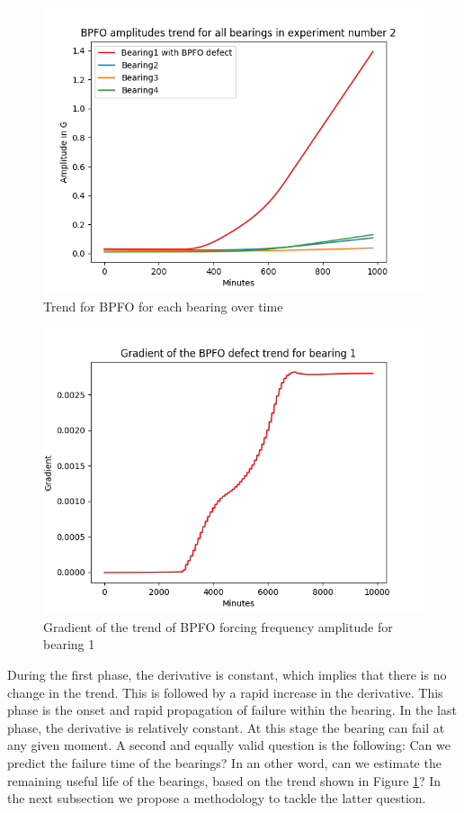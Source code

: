 \documentclass[../Main/thesis.tex]{subfiles}
\begin{document}
\begin{figure}[H] 
   \centering
   \includegraphics[width=4.9in]{../fig/experiment2_bearing_fft_trend.png} 
   \caption{Trend for BPFO for each bearing over time}
   \label{fig:experiment2_bearing_fft_trend}
\end{figure}
\begin{figure}[H] %
   \centering
   \includegraphics[width=4.9in]{../fig/bearing1_bpfo_trend_grad.png} 
   \caption{Gradient of the trend of BPFO forcing frequency amplitude for bearing 1}
   \label{fig:grad_trend}
\end{figure}
\clearpage
\justify
During the first phase, the derivative is constant, which implies that there is no change in the trend. This is followed by a rapid increase in the derivative. This phase is the onset and rapid propagation of failure within the bearing. In the last phase, the derivative is relatively constant. At this stage the bearing can fail at any given moment. A second and equally valid question is the following: Can we predict the failure time of the bearings? In an other word, can we estimate the remaining useful life of the bearings, based on the trend shown in Figure \ref{fig:experiment2_bearing_fft_trend}? In the next subsection we propose a methodology to tackle the latter question.
\end{document}
